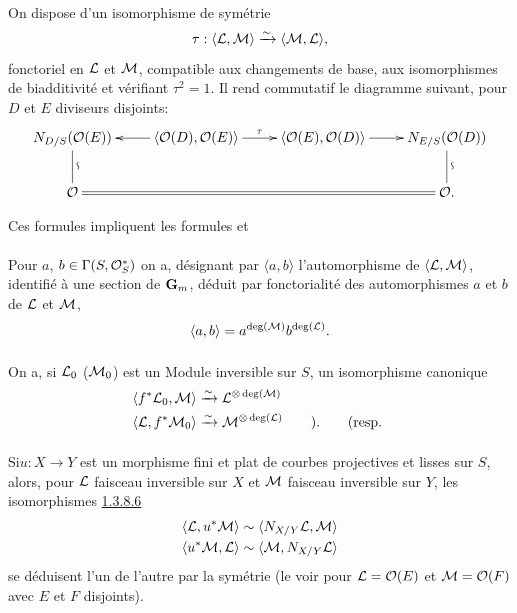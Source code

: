 \documentclass[10pt]{../fichiers-configuration-latex/smfart}
\begin{document}
\paragraph{}
On dispose d'un isomorphisme de symétrie
$$
\tau:\langle {\mathcal L},{\mathcal M}\rangle \xrightarrow{\sim}\langle {\mathcal M},{\mathcal L}\rangle {},
$$
fonctoriel en ${\mathcal L}$ et ${\mathcal M}$, compatible aux
changements de base, aux isomorphismes de biadditivité et vérifiant
$\tau^{2}=1$. Il rend commutatif le diagramme suivant, pour $D$ et $E$
diviseurs disjoints:
$$
\xymatrix{
N_{D/S}(\Oo(E))\ar@{-}[d]^{\text{\rotatebox{90}{$\backsim$}}}& \langle \Oo(D), \Oo(E)\rangle \ar[l]\ar[r]^{\tau} &
\langle \Oo(E), \Oo(D)\rangle  \ar[r]&
N_{E/S}(\Oo(D))\ar@{-}[d]^{\text{\rotatebox{90}{$\backsim$}}}\\
\Oo \ar@{=}[rrr]&    & & \Oo.
}
$$

Ces formules impliquent les formules  
 et

\paragraph{}
Pour $a$, $b\in \Gamma(S,{\mathcal O}^{\ast}_{S})$ on a, désignant par
$\langle a,b\rangle $ l'automorphisme de $\langle {\mathcal L},{\mathcal M}\rangle $, identifié à
une section de $\mathbf{G}_{m}$, déduit par fonctorialité des
automorphismes $a$ et $b$ de ${\mathcal L}$ et ${\mathcal M}$,
$$
\langle a,b\rangle =a^{\deg({\mathcal M})} b^{\deg({\mathcal L})}{}.
$$

\paragraph{}
On a, si ${\mathcal L}_0$ (\resp ${\mathcal M}_0$) est un
Module inversible sur $S$, un isomorphisme canonique
\begin{align*}
\langle f^{\ast}\Ll_0,\Mm\rangle  &\xrightarrow{\sim}
\Ll^{\otimes\deg(\Mm)}\\
\langle \Ll,f^{\ast}\Mm_0\rangle  &\xrightarrow{\sim} \Mm^{\otimes\deg(\Ll)}\qquad){\quoi}.\tag*{(\resp} 
\end{align*}

\paragraph{}
Si\pageoriginale $u:X\rightarrow Y$ est un morphisme fini et plat de
courbes projectives et lisses sur $S$, alors, pour ${\mathcal L}$
faisceau inversible sur $X$ et ${\mathcal M}$ faisceau inversible sur
$Y$, les isomorphismes \hyperref[XVIII.par1.3.8.6]{1.3.8.6}
\begin{align*}
\langle {\mathcal L},u^{\ast}{\mathcal M}\rangle  &\sim
\langle N_{X/Y}{\mathcal L},{\mathcal M}\rangle \\
\langle u^{\ast}{\mathcal M},{\mathcal L}\rangle  &\sim \langle {\mathcal M},N_{X/Y}{\mathcal L}\rangle 
\end{align*}
se déduisent l'un de l'autre par la symétrie
 (le voir pour
${\mathcal L}={\mathcal O}(E)$ et ${\mathcal M}={\mathcal O}(F)$ avec $E$ et $F$
disjoints).
\end{document}
